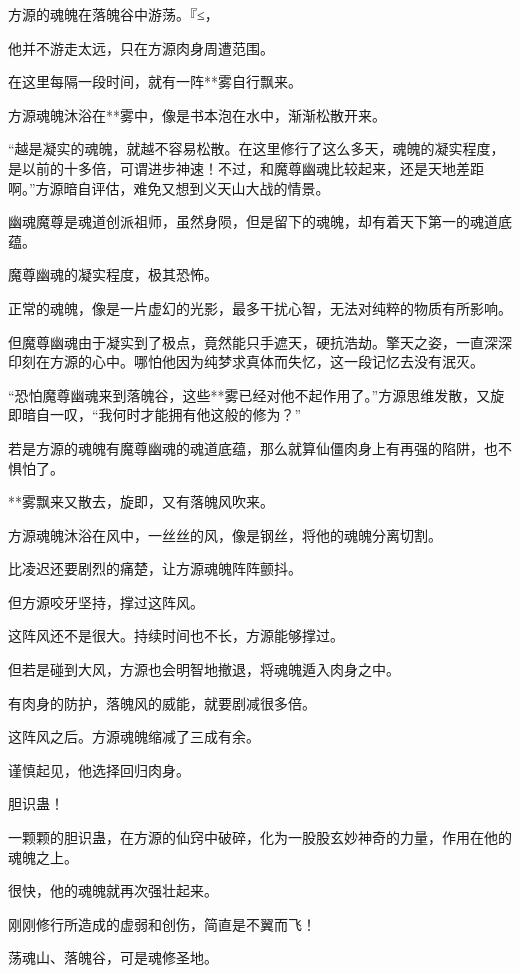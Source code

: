 
\begin{this_body}

方源的魂魄在落魄谷中游荡。『≤，

他并不游走太远，只在方源肉身周遭范围。

在这里每隔一段时间，就有一阵**雾自行飘来。

方源魂魄沐浴在**雾中，像是书本泡在水中，渐渐松散开来。

“越是凝实的魂魄，就越不容易松散。在这里修行了这么多天，魂魄的凝实程度，是以前的十多倍，可谓进步神速！不过，和魔尊幽魂比较起来，还是天地差距啊。”方源暗自评估，难免又想到义天山大战的情景。

幽魂魔尊是魂道创派祖师，虽然身陨，但是留下的魂魄，却有着天下第一的魂道底蕴。

魔尊幽魂的凝实程度，极其恐怖。

正常的魂魄，像是一片虚幻的光影，最多干扰心智，无法对纯粹的物质有所影响。

但魔尊幽魂由于凝实到了极点，竟然能只手遮天，硬抗浩劫。擎天之姿，一直深深印刻在方源的心中。哪怕他因为纯梦求真体而失忆，这一段记忆去没有泯灭。

“恐怕魔尊幽魂来到落魄谷，这些**雾已经对他不起作用了。”方源思维发散，又旋即暗自一叹，“我何时才能拥有他这般的修为？”

若是方源的魂魄有魔尊幽魂的魂道底蕴，那么就算仙僵肉身上有再强的陷阱，也不惧怕了。

**雾飘来又散去，旋即，又有落魄风吹来。

方源魂魄沐浴在风中，一丝丝的风，像是钢丝，将他的魂魄分离切割。

比凌迟还要剧烈的痛楚，让方源魂魄阵阵颤抖。

但方源咬牙坚持，撑过这阵风。

这阵风还不是很大。持续时间也不长，方源能够撑过。

但若是碰到大风，方源也会明智地撤退，将魂魄遁入肉身之中。

有肉身的防护，落魄风的威能，就要剧减很多倍。

这阵风之后。方源魂魄缩减了三成有余。

谨慎起见，他选择回归肉身。

胆识蛊！

一颗颗的胆识蛊，在方源的仙窍中破碎，化为一股股玄妙神奇的力量，作用在他的魂魄之上。

很快，他的魂魄就再次强壮起来。

刚刚修行所造成的虚弱和创伤，简直是不翼而飞！

荡魂山、落魄谷，可是魂修圣地。


\end{this_body}
